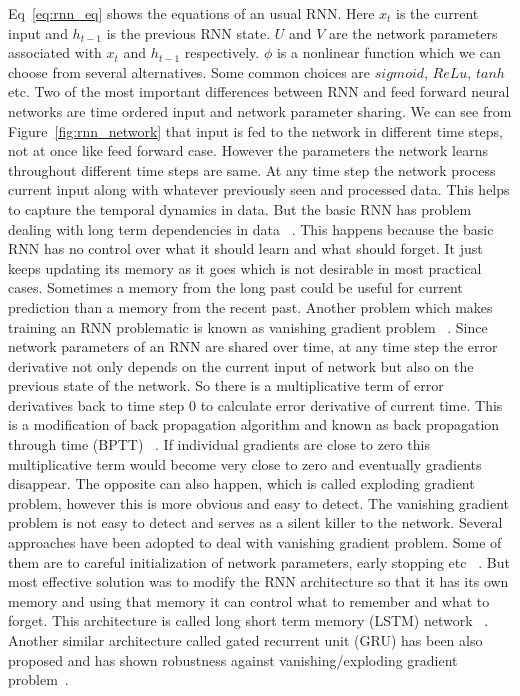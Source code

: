 \documentclass[10pt,twocolumn,letterpaper]{article}
\begin{document}
Eq~\ref{eq:rnn_eq} shows the equations of an usual RNN. Here $x_t$ is the current input and $h_{t-1}$ is the previous RNN state. $U$ and $V$ are the network parameters associated with $x_t$ and $h_{t-1}$ respectively. $\phi$ is a nonlinear function which we can choose from several alternatives. Some common choices are $sigmoid$, $ReLu$, $tanh$ etc.
Two of the most important differences between RNN and feed forward neural networks are time ordered input and network parameter sharing. We can see from Figure~\ref{fig:rnn_network} that input is fed to the network in different time steps, not at once like feed forward case. However the parameters the network learns throughout different time steps are same. At any time step the network process current input along with whatever previously seen and processed data. This helps to capture the temporal dynamics in data. But the basic RNN has problem dealing with long term dependencies in data ~\cite{DBLP:journals/corr/abs-1211-5063}. This happens because the basic RNN has no control over what it should learn and what should forget. It just keeps updating its memory as it goes which is not desirable in most practical cases. Sometimes a memory from the long past could be useful for current prediction than a memory from the recent past. Another problem which makes training an RNN problematic is known as vanishing gradient problem ~\cite{DBLP:journals/corr/abs-1211-5063}. Since network parameters of an RNN are shared over time, at any time step the error derivative not only depends on the current input of network but also on the previous state of the network. So there is a multiplicative term of error derivatives back to time step $0$ to calculate error derivative of current time. This is a modification of back propagation algorithm and known as back propagation through time (BPTT) ~\cite{58337}. If individual gradients are close to zero this multiplicative term would become very close to zero and eventually gradients disappear. The opposite can also happen, which is called exploding gradient problem, however this is more obvious and easy to detect. The vanishing gradient problem is not easy to detect and serves as a silent killer to the network. Several approaches have been adopted to deal with vanishing gradient problem. Some of them are to careful initialization of network parameters, early stopping etc ~\cite{DBLP:journals/corr/abs-1211-5063}. But most effective solution was to modify the RNN architecture so that it has its own memory and using that memory it can control what to remember and what to forget. This architecture is called long short term memory (LSTM) network ~\cite{Hochreiter:1997:LSM:1246443.1246450}. Another similar architecture called gated recurrent unit (GRU) has been also proposed and has shown robustness against vanishing/exploding gradient problem~\cite{DBLP:journals/corr/ChoMGBSB14}.
\end{document}
